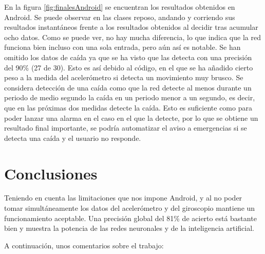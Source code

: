 \documentclass[12pt]{book}
\numberwithin{equation}{section}
\begin{document}
En la figura \ref{fig:finalesAndroid} se encuentran los resultados obtenidos en Android. Se puede observar en las clases reposo, andando y corriendo sus resultados instantáneos frente a los resultados obtenidos al decidir tras acumular ocho datos. Como se puede ver, no hay mucha diferencia, lo que indica que la red funciona bien incluso con una sola entrada, pero aún así es notable. Se han omitido los datos de caída ya que se ha visto que las detecta con una precisión del 90\% (27 de 30). Esto es así debido al código, en el que se ha añadido cierto peso a la medida del acelerómetro si detecta un movimiento muy brusco. Se considera detección de una caída como que la red detecte al menos durante un periodo de medio segundo la caída en un periodo menor a un segundo, es decir, que en las próximas dos medidas detecte la caída. Esto es suficiente como para poder lanzar una alarma en el caso en el que la detecte, por lo que se obtiene un resultado final importante, se podría automatizar el aviso a emergencias si se detecta una caída y el usuario no responde.

\newpage
\chapter{Conclusiones}

Teniendo en cuenta las limitaciones que nos impone Android, y al no poder tomar simultáneamente los datos del acelerómetro y del giroscopio mantiene un funcionamiento aceptable. Una precisión global del 81\% de acierto está bastante bien y muestra la potencia de las redes neuronales y de la inteligencia artificial.

A continuación, unos comentarios sobre el trabajo:
\end{document}
